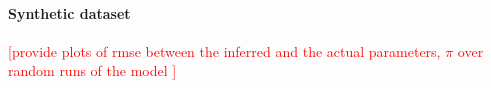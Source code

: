 \documentclass{sig-alternate}
\newcommand{\comment}[1]{\textcolor{red}{[#1]}}
\begin{document}
\paragraph{Synthetic dataset}
\comment{provide plots of rmse between the inferred and the actual
parameters, $\pi$ over random runs of the model }\\
% 
% 
% 
% 

% 
\end{document}
